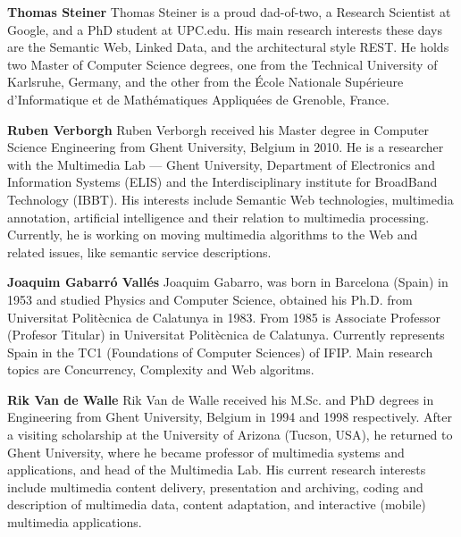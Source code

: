 \documentclass[twocolumn]{article}
\begin{document}
\vspace{5mm}

 \vspace{5mm}

\textbf{Thomas Steiner}
Thomas Steiner is a proud dad-of-two, a Research Scientist at Google, and a PhD student at UPC.edu. His main research interests these days are the Semantic Web, Linked Data, and the architectural style REST. He holds two Master of Computer Science degrees, one from the Technical University of Karlsruhe, Germany, and the other from the École Nationale Supérieure d'Informatique et de Mathématiques Appliquées de Grenoble, France.

\vspace{4mm}

\textbf{Ruben Verborgh}
Ruben Verborgh received his Master degree in Computer Science Engineering from Ghent University, Belgium in 2010. He is a researcher with the Multimedia Lab — Ghent University, Department of Electronics and Information Systems (ELIS) and the Interdisciplinary institute for BroadBand Technology (IBBT). His interests include Semantic Web technologies, multimedia annotation, artificial intelligence and their relation to multimedia processing. Currently, he is working on moving multimedia algorithms to the Web and related issues, like semantic service descriptions.

\vspace{4mm}

\textbf{Joaquim Gabarró Vallés}
Joaquim Gabarro, was born in Barcelona (Spain) in 1953 and studied Physics and Computer Science, obtained his Ph.D.
from Universitat Politècnica de Calatunya in 1983. From 1985 is Associate Professor (Profesor Titular) in Universitat Politècnica de Calatunya. Currently represents
Spain in the TC1 (Foundations of Computer Sciences) of IFIP. Main research topics
are Concurrency, Complexity and
Web algoritms.

\vspace{4mm}

\textbf{Rik Van de Walle}
Rik Van de Walle received his M.Sc. and PhD degrees in Engineering from Ghent University, Belgium in 1994 and 1998 respectively. After a visiting scholarship at the University of Arizona (Tucson, USA), he returned to Ghent University, where he became professor of multimedia systems and applications, and head of the Multimedia Lab. His current research interests include multimedia content delivery, presentation and archiving, coding and description of multimedia data, content adaptation, and interactive (mobile) multimedia applications.
\end{document}
